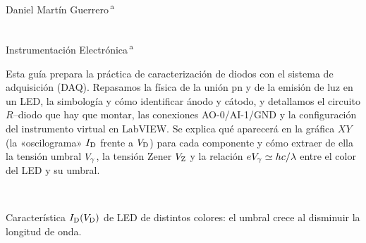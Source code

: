 \documentclass[11pt,a4paper]{article}
\begin{document}
\noindent
\begin{minipage}[t]{0.5\linewidth}
  {\color{azul}\small{}}\\[2pt]
  {\large Daniel Martín Guerrero\,\textsuperscript{a}}
\end{minipage}%
\begin{minipage}[t]{0.5\linewidth}
  {\color{azul}\small{}}\\[2pt]
  {\large Instrumentación Electrónica\,\textsuperscript{a}}
\end{minipage}
\par\vspace{5pt}
\vspace{0.55cm}

\noindent
\begin{tcolorbox}[enhanced,sharp corners,boxrule=0pt,frame hidden,
  borderline west={2.2pt}{0pt}{navy},
  interior style={left color=azulclaro,right color=white},
  left=9pt,right=6pt,top=6pt,bottom=6pt,width=\linewidth]
\begin{minipage}[t]{0.585\linewidth}
  {\color{navy}}\par\vspace{4pt}
  \small\setlength{\parindent}{0pt}\linespread{1.12}\selectfont
  Esta guía prepara la práctica de caracterización de diodos con el sistema
  de adquisición (DAQ). Repasamos la física de la unión pn y de la emisión
  de luz en un LED, la simbología y cómo identificar ánodo y cátodo, y
  detallamos el circuito $R$--diodo que hay que montar, las conexiones
  AO-0/AI-1/GND y la configuración del instrumento virtual en LabVIEW. Se
  explica qué aparecerá en la gráfica $XY$ (la «oscilograma» $I_{\mathrm D}$ frente a
  $V_{\mathrm D}$) para cada componente y cómo extraer de ella la tensión umbral
  $V_{\gamma}$, la tensión Zener $V_{\mathrm Z}$ y la relación $eV_{\gamma}\simeq hc/\lambda$ entre
  el color del LED y su umbral.
\end{minipage}\hfill
\begin{minipage}[t]{0.38\linewidth}\centering\vspace{2pt}
  \\[1pt]
  \parbox{0.95\linewidth}{\centering\scriptsize\color{grisazul}
  Característica $I_{\mathrm D}(V_{\mathrm D})$ de LED de distintos colores: el umbral crece
  al disminuir la longitud de onda.}
\end{minipage}
\end{tcolorbox}
\vspace{0.25cm}
\end{document}
